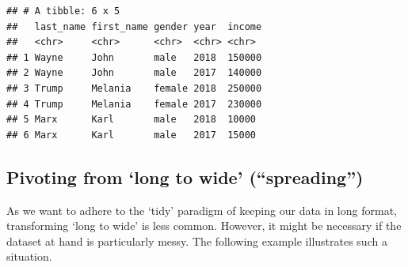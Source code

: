 \documentclass[
  12pt,
]{style/krantz}
\begin{document}
\begin{verbatim}
## # A tibble: 6 x 5
##   last_name first_name gender year  income
##   <chr>     <chr>      <chr>  <chr> <chr> 
## 1 Wayne     John       male   2018  150000
## 2 Wayne     John       male   2017  140000
## 3 Trump     Melania    female 2018  250000
## 4 Trump     Melania    female 2017  230000
## 5 Marx      Karl       male   2018  10000 
## 6 Marx      Karl       male   2017  15000
\end{verbatim}

\hypertarget{pivoting-from-long-to-wide-spreading}{%
\subsection{Pivoting from `long to wide' (``spreading'')}\label{pivoting-from-long-to-wide-spreading}}

As we want to adhere to the `tidy' paradigm of keeping our data in long format, transforming `long to wide' is less common. However, it might be necessary if the dataset at hand is particularly messy. The following example illustrates such a situation.
\end{document}
